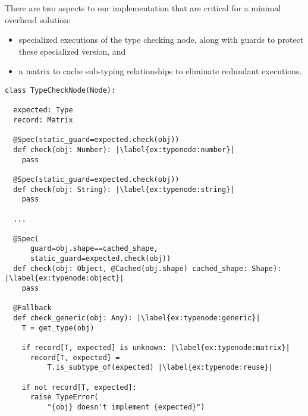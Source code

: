 There are two aspects to our implementation that are critical for a minimal overhead solution:

\begin{itemize}
  \item specialized executions of the type checking node, along with guards to protect these specialized version, and
  \item a matrix to cache sub-typing relationships to eliminate redundant executions.
\end{itemize}
 

\begin{lstlisting}[label={ex:typenode},escapechar=|,caption={An illustration of the type checking node that support type checking},float,floatplacement=htbp,columns=flexible]
class TypeCheckNode(Node):

  expected: Type
  record: Matrix

  @Spec(static_guard=expected.check(obj))
  def check(obj: Number): |\label{ex:typenode:number}|
    pass

  @Spec(static_guard=expected.check(obj))
  def check(obj: String): |\label{ex:typenode:string}|
    pass

  ...

  @Spec(
      guard=obj.shape==cached_shape,
      static_guard=expected.check(obj))
  def check(obj: Object, @Cached(obj.shape) cached_shape: Shape): |\label{ex:typenode:object}|
    pass
  
  @Fallback
  def check_generic(obj: Any): |\label{ex:typenode:generic}|
    T = get_type(obj)
    
    if record[T, expected] is unknown: |\label{ex:typenode:matrix}|
      record[T, expected] =
          T.is_subtype_of(expected) |\label{ex:typenode:reuse}|

    if not record[T, expected]:
      raise TypeError(
          "{obj} doesn't implement {expected}")
\end{lstlisting}

